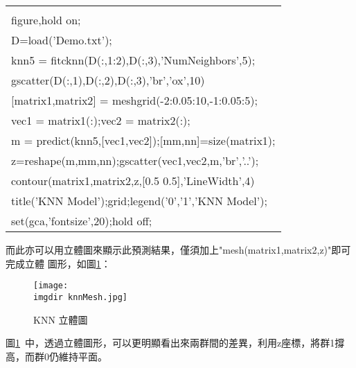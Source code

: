  			\begin{center}\colorbox{slight}{
				\begin{tabular}{p{}}
							\MJHmarker{\textbf{\color{darkblue}{MATLAB語法 :}}}\\
							figure,hold on;\\
							D=load('Demo.txt');\\
							knn5 = fitcknn(D(:,1:2),D(:,3),'NumNeighbors',5);\\
							gscatter(D(:,1),D(:,2),D(:,3),'br','ox',10)\\
							
							[matrix1,matrix2] = meshgrid(-2:0.05:10,-1:0.05:5);\\
							vec1 = matrix1(:);vec2 = matrix2(:);\\
							m = predict(knn5,[vec1,vec2]);[mm,nn]=size(matrix1);\\
							z=reshape(m,mm,nn);gscatter(vec1,vec2,m,'br','..');\\
							
							contour(matrix1,matrix2,z,[0.5 0.5],'LineWidth',4)\\
							title('KNN Model');grid;legend('0','1','KNN Model');\\
							set(gca,'fontsize',20);hold off;\\
							
				\end{tabular}
			}
			\end{center}
		而此亦可以用立體圖來顯示此預測結果，僅須加上"mesh(matrix1,matrix2,z)"即可完成立體				圖形，如圖\ref{fig:knnMesh}：
		\begin{figure}[H]	
		 	\centering	 			 	 
   			\texttt{[image: \\imgdir knnMesh.jpg]} 
   			\caption{KNN 立體圖}   		
   		 	\label{fig:knnMesh}   			 		 
		\end{figure}
		圖\ref{fig:knnMesh}\ 中，透過立體圖形，可以更明顯看出來兩群間的差異，利用z座標，將群1撐			高，而群0仍維持平面。
